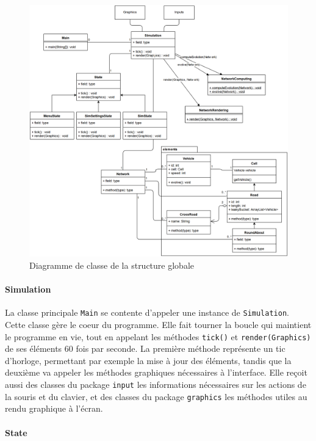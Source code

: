 \documentclass[a4paper,11pt, titlepage]{extarticle}
\begin{document}
\begin{figure}[!h]
\begin{center}
\includegraphics[width=15cm]{structure_diagram.png}
\caption{Diagramme de classe de la structure globale}
\label{imgGlobal}
\end{center}
\end{figure}

\paragraph{Simulation}

La classe principale \texttt{Main} se contente d'appeler une instance de \texttt{Simulation}. Cette classe gère le coeur du programme. Elle fait tourner la boucle qui maintient le programme en vie, tout en appelant les méthodes \texttt{tick()} et \texttt{render(Graphics)} de ses éléments 60 fois par seconde. La première méthode représente un tic d'horloge, permettant par exemple la mise à jour des éléments, tandis que la deuxième va appeler les méthodes graphiques nécessaires à l'interface. Elle reçoit aussi des classes du package \texttt{input} les informations nécessaires sur les actions de la souris et du clavier, et des classes du package \texttt{graphics} les méthodes utiles au rendu graphique à l'écran.

\paragraph{State}
\end{document}
